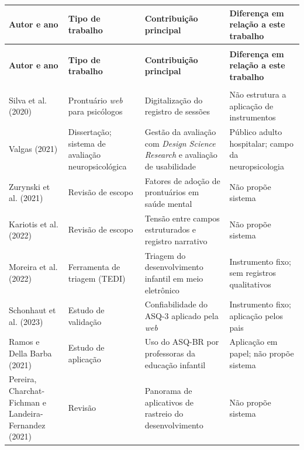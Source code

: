 {\footnotesize
\setlength{\LTpre}{0pt}
\setlength{\LTpost}{0pt}
\begin{center}\captionsetup{hypcap=false}\label{qua:estudos_relacionados}\end{center}
\vspace{-1.2\baselineskip}
\begin{longtable}{|>{\raggedright\arraybackslash}p{2.6cm}|>{\raggedright\arraybackslash}p{2.8cm}|>{\raggedright\arraybackslash}p{4.2cm}|>{\raggedright\arraybackslash}p{4.2cm}|}
\hline
\textbf{Autor e ano} & \textbf{Tipo de trabalho} & \textbf{Contribuição principal} & \textbf{Diferença em relação a este trabalho} \\ \hline
\endfirsthead
\multicolumn{4}{r}{\textit{(continuação)}} \\ \hline
\textbf{Autor e ano} & \textbf{Tipo de trabalho} & \textbf{Contribuição principal} & \textbf{Diferença em relação a este trabalho} \\ \hline
\endhead
\multicolumn{4}{r}{\textit{(continua)}} \\
\endfoot
\endlastfoot
Silva et al. (2020) & Prontuário \textit{web} para psicólogos & Digitalização do registro de sessões & Não estrutura a aplicação de instrumentos \\ \hline
Valgas (2021) & Dissertação; sistema de avaliação neuropsicológica & Gestão da avaliação com \textit{Design Science Research} e avaliação de usabilidade & Público adulto hospitalar; campo da neuropsicologia \\ \hline
Zurynski et al. (2021) & Revisão de escopo & Fatores de adoção de prontuários em saúde mental & Não propõe sistema \\ \hline
Kariotis et al. (2022) & Revisão de escopo & Tensão entre campos estruturados e registro narrativo & Não propõe sistema \\ \hline
Moreira et al. (2022) & Ferramenta de triagem (TEDI) & Triagem do desenvolvimento infantil em meio eletrônico & Instrumento fixo; sem registros qualitativos \\ \hline
Schonhaut et al. (2023) & Estudo de validação & Confiabilidade do ASQ-3 aplicado pela \textit{web} & Instrumento fixo; aplicação pelos pais \\ \hline
Ramos e Della Barba (2021) & Estudo de aplicação & Uso do ASQ-BR por professoras da educação infantil & Aplicação em papel; não propõe sistema \\ \hline
Pereira, Charchat-Fichman e Landeira-Fernandez (2021) & Revisão & Panorama de aplicativos de rastreio do desenvolvimento & Não propõe sistema \\ \hline

\end{longtable}}
